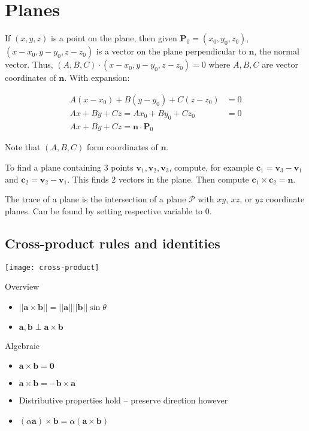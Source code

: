 \section{Planes}

If $(x,y,z)$ is a point on the plane, then given $\textbf{P}_0=(x_0,y_0,z_0)$, $(x-x_0,y-y_0,z-z_0)$ is a vector on the plane perpendicular to $\textbf{n}$, the
normal vector. Thus, $(A,B,C)\cdot(x-x_0,y-y_0,z-z_0)=0$ where $A,B,C$ are vector coordinates of $\textbf{n}$. With expansion:

\begin{align*}
    A(x-x_0)+B(y-y_0)+C(z-z_0)&=0\\
    Ax+By+Cz=Ax_0+By_0+Cz_0&=0\\
    Ax+By+Cz=\textbf{n}\cdot \textbf{P}_0
\end{align*}

Note that $(A,B,C)$ form coordinates of $\textbf{n}$.

To find a plane containing 3 points $\textbf{v}_1,\textbf{v}_2,\textbf{v}_3$, compute, for example $\textbf{c}_1=\textbf{v}_3-\textbf{v}_1$ and $\textbf{c}_2=\textbf{v}_2-\textbf{v}_1$.
This finds 2 vectors in the plane. Then compute $\textbf{c}_1\times \textbf{c}_2=\textbf{n}$. \newline

\noindent
The trace of a plane is the intersection of a plane $\mathcal{P}$ with $xy$, $xz$, or $yz$ coordinate planes. Can be found by setting respective variable to 0.

\subsection{Cross-product rules and identities}

\begin{center}
    \texttt{[image: cross-product]}
\end{center}

Overview
\begin{itemize}
    \item $||\textbf{a}\times \textbf{b}||=||\textbf{a}||||\textbf{b}||\sin\theta$
    \item $\textbf{a},\textbf{b}\perp \textbf{a}\times \textbf{b}$
\end{itemize}

Algebraic
\begin{itemize}
    \item $\textbf{a}\times \textbf{b}=\textbf{0}$
    \item $\textbf{a}\times \textbf{b}=-\textbf{b}\times \textbf{a}$
    \item Distributive properties hold -- preserve direction however
    \item $(\alpha \textbf{a})\times \textbf{b}=\alpha(\textbf{a}\times \textbf{b})$
\end{itemize}

